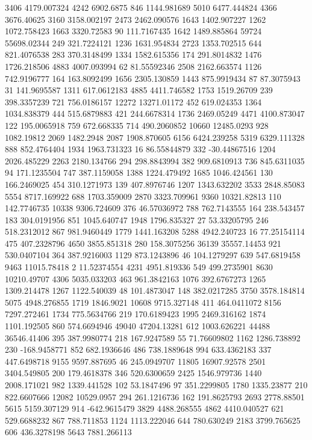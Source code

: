 3406	4179.007324
4242	6902.6875
846	1144.981689
5010	6477.444824
4366	3676.40625
3160	3158.002197
2473	2462.090576
1643	1402.907227
1262	1072.758423
1663	3320.72583
90	111.7167435
1642	1489.885864
59724	55698.02344
249	321.7224121
1236	1631.954834
2723	1353.702515
644	821.4076538
283	370.3148499
1334	1582.615356
174	291.8014832
1476	1726.218506
4883	4007.093994
62	81.55592346
2508	2162.663574
1126	742.9196777
164	163.8092499
1656	2305.130859
1443	875.9919434
87	87.3075943
31	141.9695587
1311	617.0612183
4885	4411.746582
1753	1519.26709
239	398.3357239
721	756.0186157
12272	13271.01172
452	619.024353
1364	1034.838379
444	515.6879883
421	244.6678314
1736	2469.05249
4471	4100.873047
122	195.0065918
759	672.668335
714	490.2060852
10660	12485.0293
928	1082.19812
2069	1482.2948
2087	1908.870605
6156	6424.239258
5319	6329.111328
888	852.4764404
1934	1963.731323
16	86.55844879
332	-30.44867516
1204	2026.485229
2263	2180.134766
294	298.8843994
382	909.6810913
736	845.6311035
94	171.1235504
747	387.1159058
1388	1224.479492
1685	1046.424561
130	166.2469025
454	310.1271973
139	407.8976746
1207	1343.632202
3533	2848.85083
5554	8717.169922
688	1703.359009
2870	3323.709961
9360	10321.82813
110	142.7746735
10338	9306.724609
376	46.57036972
788	762.7143555
164	238.543457
183	304.0191956
851	1045.640747
1948	1796.835327
27	53.33205795
246	518.2312012
867	981.9460449
1779	1441.163208
5288	4942.240723
16	77.25154114
475	407.2328796
4650	3855.851318
280	158.3075256
36139	35557.14453
921	530.0407104
364	387.9216003
1129	873.1243896
46	104.1279297
639	547.6819458
9463	11015.78418
2	11.52374554
4231	4951.819336
549	499.2735901
8630	10210.49707
4306	5035.033203
463	961.3842163
1076	392.6767273
1265	1309.214478
1267	1122.540039
48	101.4873047
148	382.0217285
3750	3578.184814
5075	4948.276855
1719	1846.9021
10608	9715.327148
411	464.0411072
8156	7297.272461
1734	775.5634766
219	170.6189423
1995	2469.316162
1874	1101.192505
860	574.6694946
49040	47204.13281
612	1003.626221
44488	36546.41406
395	387.9980774
218	167.9247589
55	71.76609802
1162	1286.738892
230	-168.9458771
852	682.1936646
486	738.1889648
994	633.4362183
337	447.6498718
9155	9597.887695
46	245.0949707
11805	16907.92578
2501	3404.549805
200	179.4618378
346	520.6300659
2425	1546.979736
1440	2008.171021
982	1339.441528
102	53.1847496
97	351.2299805
1780	1335.23877
210	822.6607666
12082	10529.0957
294	261.1216736
162	191.8625793
2693	2778.88501
5615	5159.307129
914	-642.9615479
3829	4488.268555
4862	4410.040527
621	529.6688232
867	788.711853
1124	1113.222046
644	780.630249
2183	3799.765625
606	436.3278198
5643	7881.266113
